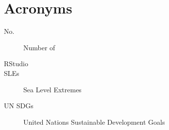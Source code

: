 
\chapter{Acronyms}
\begin{description}
\item[No.] Number of
\item [RStudio]
\item[SLEs] Sea Level Extremes
\item [UN SDGs] United Nations Sustainable Development Goals 
\end{description}